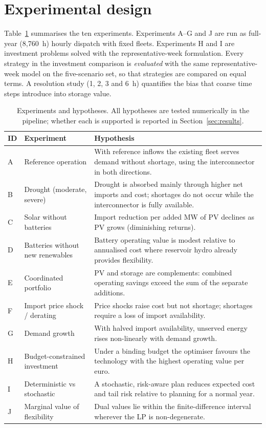 \section{Experimental design}
\label{sec:design}

Table~\ref{tab:experiments} summarises the ten experiments. Experiments A--G and J are run as full-year
(8{,}760~h) hourly dispatch with fixed fleets. Experiments H and I are investment problems solved with the
representative-week formulation. Every strategy in the investment comparison is \emph{evaluated} with the same
representative-week model on the five-scenario set, so that strategies are compared on equal terms. A
resolution study (1, 2, 3 and 6~h) quantifies the bias that coarse time steps introduce into storage value.

\begin{table}[htbp]
\centering\footnotesize
\caption{Experiments and hypotheses. All hypotheses are tested numerically in the pipeline; whether each is
supported is reported in Section~\ref{sec:results}.}
\label{tab:experiments}
\begin{tabular}{p{0.6cm}p{3.8cm}p{11.2cm}}
\toprule
ID & Experiment & Hypothesis \\
\midrule
A & Reference operation & With reference inflows the existing fleet serves demand without shortage, using the interconnector in both directions. \\
B & Drought (moderate, severe) & Drought is absorbed mainly through higher net imports and cost; shortages do not occur while the interconnector is fully available. \\
C & Solar without batteries & Import reduction per added MW of PV declines as PV grows (diminishing returns). \\
D & Batteries without new renewables & Battery operating value is modest relative to annualised cost where reservoir hydro already provides flexibility. \\
E & Coordinated portfolio & PV and storage are complements: combined operating savings exceed the sum of the separate additions. \\
F & Import price shock / derating & Price shocks raise cost but not shortage; shortages require a loss of import availability. \\
G & Demand growth & With halved import availability, unserved energy rises non-linearly with demand growth. \\
H & Budget-constrained investment & Under a binding budget the optimiser favours the technology with the highest operating value per euro. \\
I & Deterministic vs stochastic & A stochastic, risk-aware plan reduces expected cost and tail risk relative to planning for a normal year. \\
J & Marginal value of flexibility & Dual values lie within the finite-difference interval wherever the LP is non-degenerate. \\
\bottomrule
\end{tabular}
\end{table}
